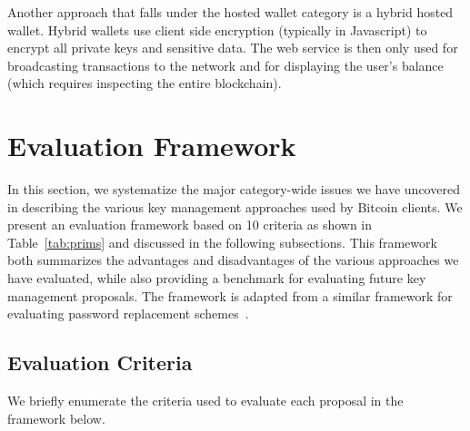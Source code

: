Another approach that falls under the hosted wallet category is a hybrid hosted wallet. Hybrid wallets use client side encryption (typically in Javascript) to encrypt all private keys and sensitive data. The web service is then only used for broadcasting transactions to the network and for displaying the user's balance (which requires inspecting the entire blockchain).





\section{Evaluation Framework}
In this section, we systematize the major category-wide issues we have uncovered in describing the various key management approaches used by Bitcoin clients. We present an evaluation framework based on 10 criteria as shown in Table~\ref{tab:prims} and discussed in the following subsections. This framework both summarizes the advantages and disadvantages of the various approaches we have evaluated, while also providing a benchmark for evaluating future key management proposals. The framework is adapted from a similar framework for evaluating password replacement schemes~\cite{BHOS12}.

\subsection{Evaluation Criteria}
We briefly enumerate the criteria used to evaluate each proposal in the framework below. 

